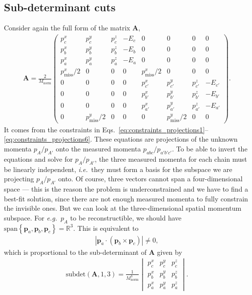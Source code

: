 \documentclass[twoside,english]{uiofysmaster}
\begin{document}
\subsection{Sub-determinant cuts}
Consider again the full form of the matrix $\mathbf{A}$, 
\begin{align}
	\mathbf{A} = \frac{2}{M_\mathrm{norm}} \begin{pmatrix}
						p_c^x & p_c^y & p_c^z & -E_c & 0 & 0 & 0 & 0 \\
						p_b^x & p_b^y & p_b^z & -E_b & 0 & 0 & 0 & 0 \\
						p_a^x & p_a^y & p_a^z & -E_a & 0 & 0 & 0 & 0 \\
						p_\mathrm{miss}^x/2 & 0 & 0 & 0 & p_\mathrm{miss}^x/2 & 0 & 0 & 0\\
						0 & 0 & 0 & 0 & p_{c'}^x & p_{c'}^y & p_{c'}^z & -E_{c'} \\
						0 & 0 & 0 & 0 & p_{b'}^x & p_{b'}^y & p_{b'}^z & -E_{b'} \\
						0 & 0 & 0 & 0 & p_{a'}^x & p_{a'}^y & p_{a'}^z & -E_{a'} \\
						0 & p_\mathrm{miss}^y/2 & 0 & 0 & 0 & p_\mathrm{miss}^y/2 & 0 & 0
					\end{pmatrix}. \label{eq:Amatrix_modified_subdetAcut}
\end{align}
It comes from the constraints in Eqs.\ \eqref{eq:constraints_projections1}--\eqref{eq:constraints_projections6}. These equations are projections of the unknown momenta $p_A / p_{A'}$ onto the measured momenta $p_{abc} / p_{a'b'c'}$. To be able to invert the equations and solve for $p_A / p_{A'}$, the three measured momenta for each chain must be linearly independent, {\it i.e.}\ they must form a basis for the subspace we are projecting $p_A/p_{A'}$ onto. Of course, three vectors cannot span a four-dimensional space --- this is the reason the problem is underconstrained and we have to find a best-fit solution, since there are not enough measured momenta to fully constrain the invisible ones. But we can look at the three-dimensional spatial momentum subspace. For {\it e.g.}\ $p_A$ to be reconstructible, we should have $\mathrm{span}\left\{ \mathbf p_a, \mathbf p_b, \mathbf p_c \right\} = \mathbb{R}^3$. This is equivalent to
\begin{align}
	\left| \mathbf p_a \cdot \left( \mathbf p_b \times \mathbf p_c \right) \right| \neq 0,\label{eq:vector_triple_product_parallellogram}
\end{align}
which is proportional to the sub-determinant of $\mathbf{A}$ given by
\begin{align}
	\mathrm{subdet}(\mathbf{A}, 1,3) = \frac{1}{M^3_\mathrm{norm}}\begin{vmatrix}p_c^x & p_c^y & p_c^z\\
	p_b^x & p_b^y & p_b^z\\
	p_a^x & p_a^y & p_a^z\end{vmatrix}.
\end{align}
\end{document}
